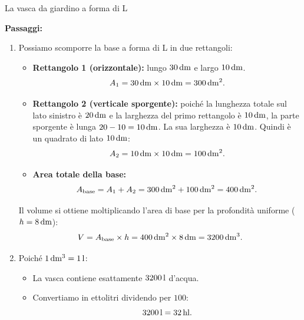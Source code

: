 \begin{esercizio}{La vasca da giardino a forma di L}
\begin{soluzione}
  \textbf{Passaggi:}
  \begin{enumerate}[label=\alph*)]
    \item Possiamo scomporre la base a forma di L in due rettangoli:
    \begin{itemize}
      \item \textbf{Rettangolo 1 (orizzontale):} lungo $30\,\mathrm{dm}$ e largo $10\,\mathrm{dm}$.
      \[
      A_1 = 30\,\mathrm{dm} \times 10\,\mathrm{dm} = 300\,\mathrm{dm^2}.
      \]
      \item \textbf{Rettangolo 2 (verticale sporgente):} poiché la lunghezza totale sul lato sinistro è $20\,\mathrm{dm}$ e la larghezza del primo rettangolo è $10\,\mathrm{dm}$, la parte sporgente è lunga $20 - 10 = 10\,\mathrm{dm}$. La sua larghezza è $10\,\mathrm{dm}$. Quindi è un quadrato di lato $10\,\mathrm{dm}$:
      \[
      A_2 = 10\,\mathrm{dm} \times 10\,\mathrm{dm} = 100\,\mathrm{dm^2}.
      \]
      \item \textbf{Area totale della base:}
      \[
      A_{\text{base}} = A_1 + A_2 = 300\,\mathrm{dm^2} + 100\,\mathrm{dm^2} = 400\,\mathrm{dm^2}.
      \]
    \end{itemize}
    Il volume si ottiene moltiplicando l'area di base per la profondità uniforme ($h = 8\,\mathrm{dm}$):
    \[
    V = A_{\text{base}} \times h = 400\,\mathrm{dm^2} \times 8\,\mathrm{dm} = 3200\,\mathrm{dm^3}.
    \]
    \item Poiché $1\,\mathrm{dm^3} = 1\,\mathrm{l}$:
    \begin{itemize}
      \item La vasca contiene esattamente $3200\,\mathrm{l}$ d'acqua.
      \item Convertiamo in ettolitri dividendo per $100$:
      \[
      3200\,\mathrm{l} = 32\,\mathrm{hl}.
      \]
    \end{itemize}
  \end{enumerate}
\end{soluzione}
\end{esercizio}

\condnewpage

